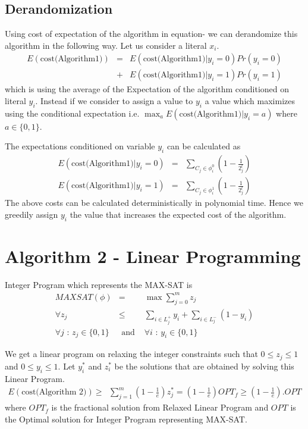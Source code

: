 \documentclass[10pt]{article}
\begin{document}
\subsection{Derandomization}
Using cost of expectation of the algorithm in equation-\label{algo-1} we can derandomize this algorithm in the following way. Let us consider a literal $x_i$. 
\begin{eqnarray}
E(\mbox{cost(Algorithm1)}) & = & E(\mbox{cost(Algorithm1)} | y_i = 0) Pr(y_i = 0) \nonumber \\
                            & + &E(\mbox{cost(Algorithm1)} | y_i = 1) Pr(y_i = 1) \nonumber
\end{eqnarray}
which is using the average of the Expectation of the algorithm conditioned on literal $y_i$. Instead if we consider to assign a
value to $y_i$ a value which maximizes using the conditional expectation i.e. $\max_a E(\mbox{cost(Algorithm1)} | y_i = a)$
where $ a \in \{0,1\}$.

The expectations conditioned on variable $y_i$ can be calculated as  
\begin{eqnarray}
E(\mbox{cost(Algorithm1)} | y_i = 0) & = &\sum_{C_j \in \phi_i^0} ( 1 - \frac{1}{2^l_j}) \nonumber \\
E(\mbox{cost(Algorithm1)} | y_i = 1) & = &\sum_{C_j \in \phi_i^1} ( 1 - \frac{1}{2^l_j}) \nonumber
\end{eqnarray}
The above costs can be calculated deterministically in polynomial time. Hence we greedily assign $y_i$ the value that increases the expected cost of
the algorithm.

\section{Algorithm 2 - Linear Programming}
Integer Program which represents the MAX-SAT is
\begin{eqnarray}
MAXSAT(\phi) & = &\max \sum_{j=0}^m z_j \nonumber \\
\forall z_j  & \leq &\sum_{i \in L_j^+} y_i + \sum_{i \in L_j^-} (1 - y_i) \nonumber \\
\forall j\mbox{ : } z_j \in \{0, 1\} & \mbox{ and } & \forall i\mbox{ : }  y_i \in \{0, 1\} \nonumber 
\end{eqnarray}

We get a linear program on relaxing the integer constraints such that $0 \leq z_j \leq 1$ and $0 \leq y_i \leq 1$. Let $y_i^*$ and $z_i^*$ be the solutions that are obtained by solving this Linear Program.
\begin{eqnarray}
E(\mbox{cost(Algorithm 2)}) &\geq& \sum_{j=1}^m (1 - \frac{1}{e}) z_j^* = ( 1 - \frac{1}{e}) OPT_f \geq (1 - \frac{1}{e}).OPT \nonumber
\end{eqnarray}
where $OPT_f$ is the fractional solution from  Relaxed Linear Program and $OPT$ is the Optimal solution for Integer Program representing MAX-SAT.
\end{document}
